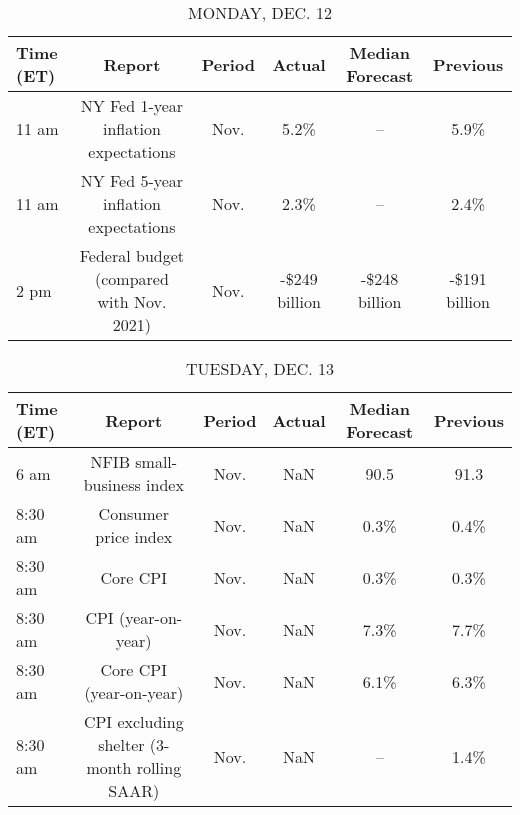 \documentclass{article}%
\begin{document}
%
\normalsize%


\begin{table}[htbp]%
\caption{MONDAY, DEC. 12}%
\centering%
\begin{adjustbox}{width=1\textwidth}%
\begin{tabular}{lccccc}
\toprule
Time (ET) &                                   Report & Period &        Actual & Median Forecast &      Previous \\
\midrule
    11 am &     NY Fed 1-year inflation expectations &   Nov. &          5.2\% &              -- &          5.9\% \\
    11 am &     NY Fed 5-year inflation expectations &   Nov. &          2.3\% &              -- &          2.4\% \\
     2 pm & Federal budget (compared with Nov. 2021) &   Nov. & -\$249 billion &   -\$248 billion & -\$191 billion \\
\bottomrule
\end{tabular}
%
\end{adjustbox}%
\end{table}

%


\begin{table}[htbp]%
\caption{TUESDAY, DEC. 13}%
\centering%
\begin{adjustbox}{width=1\textwidth}%
\begin{tabular}{lccccc}
\toprule
Time (ET) &                                       Report & Period & Actual & Median Forecast & Previous \\
\midrule
     6 am &                    NFIB small-business index &   Nov. &    NaN &            90.5 &     91.3 \\
  8:30 am &                         Consumer price index &   Nov. &    NaN &            0.3\% &     0.4\% \\
  8:30 am &                                     Core CPI &   Nov. &    NaN &            0.3\% &     0.3\% \\
  8:30 am &                           CPI (year-on-year) &   Nov. &    NaN &            7.3\% &     7.7\% \\
  8:30 am &                      Core CPI (year-on-year) &   Nov. &    NaN &            6.1\% &     6.3\% \\
  8:30 am & CPI excluding shelter (3-month rolling SAAR) &   Nov. &    NaN &              -- &     1.4\% \\
\bottomrule
\end{tabular}
%
\end{adjustbox}%
\end{table}
\end{document}
